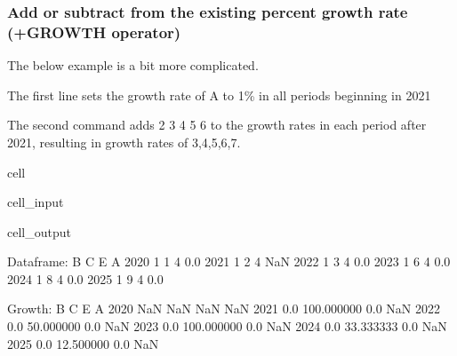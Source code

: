 \documentclass[letterpaper,10pt,english]{jupyterBook}
\begin{document}
\subsubsection{Add or subtract from the existing percent growth rate (+GROWTH operator)}
\label{\detokenize{content/04_PythonEssentials/UpdateCommand:add-or-subtract-from-the-existing-percent-growth-rate-growth-operator}}
\sphinxAtStartPar
The below example is a bit more complicated.

\sphinxAtStartPar
The first line sets the growth rate of A to 1\% in all periods beginning in  2021

\sphinxAtStartPar
The second command adds 2 3 4 5 6 to the growth rates in each period after 2021, resulting in growth rates of 3,4,5,6,7.

\begin{sphinxuseclass}{cell}\begin{sphinxVerbatimInput}

\begin{sphinxuseclass}{cell_input}
\begin{sphinxVerbatim}[commandchars=\\\{\}]
 
\end{sphinxVerbatim}

\end{sphinxuseclass}\end{sphinxVerbatimInput}
\begin{sphinxVerbatimOutput}

\begin{sphinxuseclass}{cell_output}
\begin{sphinxVerbatim}[commandchars=\\\{\}]
Dataframe:
      B  C  E    A
2020  1  1  4  0.0
2021  1  2  4  NaN
2022  1  3  4  0.0
2023  1  6  4  0.0
2024  1  8  4  0.0
2025  1  9  4  0.0

Growth:
        B           C    E   A
2020  NaN         NaN  NaN NaN
2021  0.0  100.000000  0.0 NaN
2022  0.0   50.000000  0.0 NaN
2023  0.0  100.000000  0.0 NaN
2024  0.0   33.333333  0.0 NaN
2025  0.0   12.500000  0.0 NaN
\end{sphinxVerbatim}

\end{sphinxuseclass}\end{sphinxVerbatimOutput}

\end{sphinxuseclass}
\end{document}
